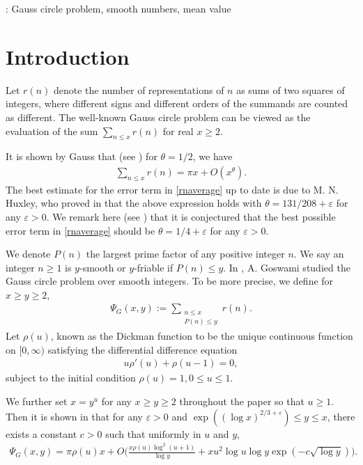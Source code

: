 \documentclass[twoside,leqno,10pt, A4]{amsart}
\begin{document}
:  Gauss circle problem, smooth numbers, mean value

\section{Introduction}\label{sec1}

 Let $r(n)$ denote the number of representations of $n$ as sums of two squares of integers, where different signs and different orders of the summands are counted as different. The well-known Gauss circle problem can be viewed as the evaluation of the sum $\sum_{n \leq x}r(n)$ for real $x \geq 2$.

  It is shown by Gauss that (see \cite[(1.70)]{iwakow}) for $\theta=1/2$, we have
\begin{align}
\label{rnaverage}
  \sum_{n \leq x}r(n)=\pi x+O(x^{\theta}).
\end{align}  
   The best estimate for the error term in \eqref{rnaverage} up to date is due to M. N. Huxley, who proved in \cite{Huxley03} that the above expression holds with $\theta=131/208+\varepsilon$ for any $\varepsilon>0$. We remark here (see \cite[p. 215]{iwakow}) that it is conjectured that the best possible error term in \eqref{rnaverage} should be $\theta=1/4+\varepsilon$ for any $\varepsilon>0$. 

  We denote $P(n)$ the largest prime factor of any positive integer $n$. We say an integer $n \geq 1$ is $y$-smooth or $y$-friable if $P(n) \leq y$. 
  In \cite{Goswami24}, A. Goswami studied the Gauss circle problem over smooth integers. To be more precise, we define for $x \geq y \geq 2$, 
\begin{align}
\label{Psif}
 \Psi_G(x,y):=\sum_{\substack{n \leq x \\ P(n) \leq y}}r(n). 
\end{align}
   Let $\rho(u)$, known as the Dickman function to be the unique continuous function on $[0, \infty)$ satisfying the differential difference equation
\begin{align*}
 u\rho'(u)+\rho(u-1)=0,
\end{align*}
  subject to the initial condition $\rho(u)=1, 0 \leq u \leq 1$. 
  
  We further set $x=y^u$ for any $x \geq y \geq 2$ throughout the paper so that $u \geq 1$. Then it is shown in \cite[Theorem 2.2]{Goswami24} that for any $\varepsilon>0$ and $\exp((\log x)^{2/3+\varepsilon}) \leq y \leq x$, there exists a constant $c>0$ such that uniformly in $u$ and $y$, 
\begin{align}
\label{psiGasymp}
 \Psi_G(x,y)=\pi\rho(u)x+O\Big(\frac {x\rho(u)\log^2(u+1)}{\log y}+xu^2\log u  \log y \exp(-c\sqrt{\log y})\Big ).
\end{align}  
  
\end{document}

